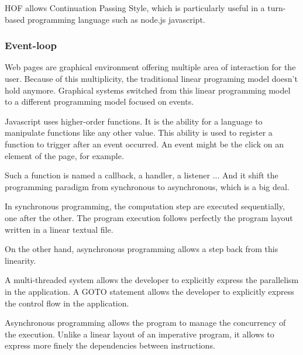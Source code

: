 HOF allows Continuation Passing Style, which is particularly useful in a turn-based programming language such as node.js javascript.



\subsubsection{Event-loop}

Web pages are graphical environment offering multiple area of interaction for the user.
Because of this multiplicity, the traditional linear programing model doesn't hold anymore.
Graphical systems switched from this linear programming model to a different programming model focused on events.

Javascript uses higher-order functions.
It is the ability for a language to manipulate functions like any other value.
This ability is used to register a function to trigger after an event occurred.
An event might be the click on an element of the page, for example.

Such a function is named a callback, a handler, a listener ...
And it shift the programming paradigm from synchronous to asynchronous, which is a big deal.

In synchronous programming, the computation step are executed sequentially, one after the other.
The program execution follows perfectly the program layout written in a linear textual file.

On the other hand, asynchronous programming allows a step back from this linearity.


A multi-threaded system allows the developer to explicitly express the parallelism in the application.
A GOTO statement allows the developer to explicitly express the control flow in the application.


Asynchronous programming allows the program to manage the concurrency of the execution.
Unlike a linear layout of an imperative program, it allows to express more finely the dependencies between instructions.



